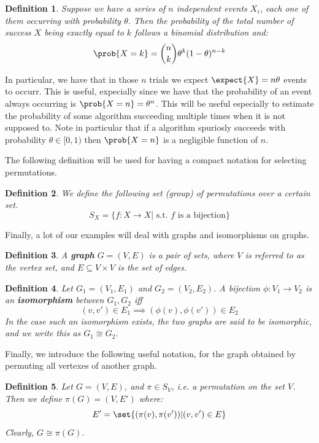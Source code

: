 \documentclass{article}
\newtheorem{definition}{Definition}
\begin{document}
\begin{definition}
    Suppose we have a series of $n$ independent events $X_i$, each one of them
    occurring with probability $\theta$. Then the probability of the total number of success $X$ being exactly equal to $k$ follows a binomial distribution and:
    \[ \prob{X = k} = \binom{n}{k} \theta^k (1 - \theta)^{n - k} \]
\end{definition}
In particular, we have that in those $n$ trials we expect $\expect{X} = n\theta$ events to occurr. This is useful, expecially since
we have that the probability of an event always occurring is $\prob{X = n} = \theta^n$. This will be useful especially
to  estimate the probability of some algorithm succeeding multiple times when it is not supposed to.
Note in particular that if a algorithm spuriosly succeeds with probability $\theta \in [0, 1)$ then $\prob{X = n}$ is a
negligible function of $n$. \par

The following definition will be used for having a compact notation for selecting permutations.

\begin{definition}
    We define the following set (group) of permutations over a certain set.
    \[ S_X = \{ f: X \to X | \text{ s.t. } f \text{ is a bijection} \} \]
\end{definition}

Finally, a lot of our examples will deal with graphs and isomorphisms on graphs.

\begin{definition}
    A \textbf{graph} $G = (V, E)$ is a pair of sets, where $V$ is referred to as the vertex set, and $E \subseteq V \times V$ is the set of edges.
\end{definition}

\begin{definition}
    Let $G_1 = (V_1, E_1)$ and $G_2 = (V_2, E_2)$. A bijection $\phi: V_1 \to V_2$ is an \textbf{isomorphism} between $G_1, G_2$ iff
    \[ (v, v') \in E_1 \implies (\phi(v), \phi(v')) \in E_2 \]
    In the case such an isomorphism exists, the two graphs are said to be isomorphic, and we write this as $G_1 \cong G_2$.
\end{definition}

Finally, we introduce the following useful notation, for the graph obtained by permuting all vertexes of another graph.
\begin{definition}
    Let $G = (V, E)$, and $\pi \in S_V$, i.e. a permutation on the set $V$. Then we define $\pi(G) = (V, E')$ where:
    \[ E' = \set{ (\pi(v), \pi(v')) | (v, v') \in E } \]
    Clearly, $G \cong \pi(G)$.
\end{definition}
\end{document}
